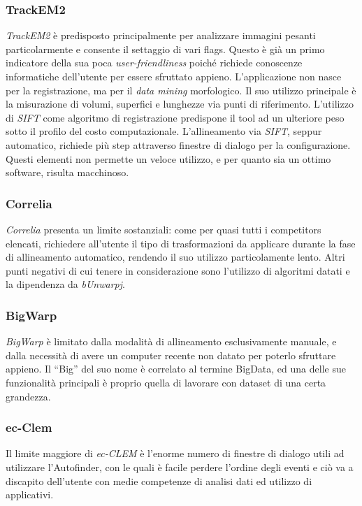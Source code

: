 \subsubsection{TrackEM2}
\noindent \textit{TrackEM2} è predisposto principalmente per analizzare immagini pesanti particolarmente e consente il settaggio di vari flags.
Questo è già un primo indicatore della sua poca \textit{user-friendliness} poiché richiede conoscenze informatiche dell'utente per essere sfruttato appieno. L'applicazione non nasce per la registrazione, ma per il \textit{data mining} morfologico. Il suo utilizzo principale è la misurazione di volumi, superfici e lunghezze via punti di riferimento. L'utilizzo di \textit{SIFT} come algoritmo di registrazione predispone il tool ad un ulteriore peso sotto il profilo del costo computazionale. L'allineamento via \textit{SIFT}, seppur automatico, richiede più step attraverso finestre di dialogo per la configurazione. Questi elementi non permette un veloce utilizzo, e per quanto sia un ottimo software, risulta macchinoso.

\subsubsection{Correlia}
\noindent \textit{Correlia} presenta un limite sostanziali: come per quasi tutti i competitors elencati, richiedere all'utente il tipo di trasformazioni da applicare durante la fase di allineamento automatico, rendendo il suo utilizzo particolamente lento. Altri punti negativi di cui tenere in considerazione sono l'utilizzo di algoritmi datati e la dipendenza da \textit{bUnwarpj}.

\subsubsection{BigWarp}
\noindent \textit{BigWarp} è limitato dalla modalità di allineamento esclusivamente manuale, e dalla necessità di avere un computer recente non datato per poterlo sfruttare appieno. Il ``Big'' del suo nome è correlato al termine BigData, ed una delle sue funzionalità principali è proprio quella di lavorare con dataset di una certa grandezza.

\subsubsection{ec-Clem}
\noindent Il limite maggiore di \textit{ec-CLEM} è l'enorme numero di finestre di dialogo utili ad utilizzare l'Autofinder, con le quali è facile perdere l'ordine degli eventi e ciò va a discapito dell'utente con medie competenze di analisi dati ed utilizzo di applicativi.

